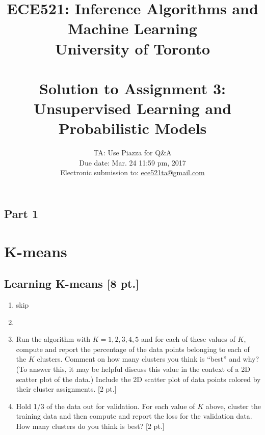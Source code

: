 \documentclass[12pt,letterpaper]{article}
\begin{document}
\title{\vspace{-4ex}ECE521: Inference Algorithms and Machine Learning \\
University of Toronto\\ \  \\
Solution to Assignment 3: \\Unsupervised Learning and Probabilistic Models}
\date{\vspace{-8ex}TA: Use Piazza for Q\&A \\ Due date: Mar. 24 11:59 pm, 2017 \\ Electronic submission to: \href{mailto:ece521ta@gmail.com}{ece521ta@gmail.com} }


\maketitle

\begin{mycomments}
\section{Part 1}
\end{mycomments}
\section{K-means}

\subsection{Learning K-means [8 pt.]}

\begin{enumerate}
\item skip
\item  
\item Run the algorithm with $K={1,2,3,4,5}$ and for each of these values of $K$, compute and report the percentage of the data points belonging to each of the $K$ clusters. Comment on how many clusters you think is ``best'' and why? (To answer this, it may be helpful discuss this value in the context of a 2D scatter plot of the data.) Include the 2D scatter plot of data points colored by their cluster assignments. [2 pt.] 
\item Hold 1/3 of the data out for validation. For each value of $K$ above, cluster the training data and then compute and report the loss for the validation data. How many clusters do you think is best? [2 pt.]
\end{enumerate}
\end{document}
